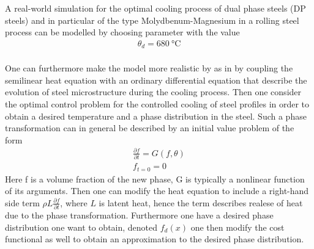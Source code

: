 A real-world simulation for the optimal cooling process of dual phase steels (DP steels) and in particular of the type Molydbenum-Magnesium in a rolling steel process can be modelled by choosing parameter with the value 
\begin{align*}
    \theta_d = \SI{680}{\celsius} \\
\end{align*}

One can furthermore make the model more realistic by as in \cite{DPSteelOverview} by coupling the semilinear heat equation with an ordinary differential equation that describe the evolution of steel microstructure during the cooling process. Then one consider the optimal control problem for the controlled cooling of steel profiles in order to obtain a desired temperature and a phase distribution in the steel. Such a phase transformation can in general be described by an initial value problem of the form 
\begin{align*}
    \frac{\partial f}{\partial t} = G(f,\theta ) \\
    f_{t=0} = 0
\end{align*}
Here f is a volume fraction of the new phase, G is typically a nonlinear function of its arguments. Then one can modify the heat equation to include a right-hand side term $\rho L \frac{\partial f}{\partial t}$, where $L$ is latent heat, hence the term describes realese of heat due to the phase transformation. Furthermore one have a desired phase distribution one want to obtain, denoted $f_d(x)$ one then modify the cost functional as well to obtain an approximation to the desired phase distribution. 